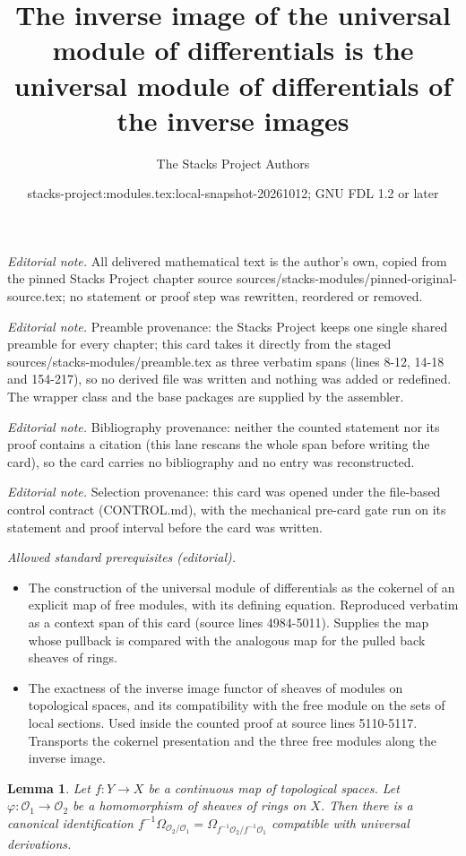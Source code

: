 \documentclass[10pt,a4paper]{amsart}
\title{The inverse image of the universal module of differentials is the universal module of differentials of the inverse images}
\author{The Stacks Project Authors}
\date{stacks-project:modules.tex:local-snapshot-20261012; GNU FDL 1.2 or later}
\theoremstyle{plain}
\newtheorem{lemma}[subsection]{Lemma}
\theoremstyle{definition}
\theoremstyle{remark}
\numberwithin{equation}{subsection}
\begin{document}
\maketitle
\noindent\textit{Editorial note.} All delivered mathematical text is the author's own, copied from the pinned Stacks Project chapter source sources/stacks-modules/pinned-original-source.tex; no statement or proof step was rewritten, reordered or removed.\par\medskip
\noindent\textit{Editorial note.} Preamble provenance: the Stacks Project keeps one single shared preamble for every chapter; this card takes it directly from the staged sources/stacks-modules/preamble.tex as three verbatim spans (lines 8-12, 14-18 and 154-217), so no derived file was written and nothing was added or redefined. The wrapper class and the base packages are supplied by the assembler.\par\medskip
\noindent\textit{Editorial note.} Bibliography provenance: neither the counted statement nor its proof contains a citation (this lane rescans the whole span before writing the card), so the card carries no bibliography and no entry was reconstructed.\par\medskip
\noindent\textit{Editorial note.} Selection provenance: this card was opened under the file-based control contract (CONTROL.md), with the mechanical pre-card gate run on its statement and proof interval before the card was written.\par\medskip
\noindent\textit{Allowed standard prerequisites (editorial).}\begin{itemize}
\item The construction of the universal module of differentials as the cokernel of an explicit map of free modules, with its defining equation. Reproduced verbatim as a context span of this card (source lines 4984-5011). Supplies the map whose pullback is compared with the analogous map for the pulled back sheaves of rings.
\item The exactness of the inverse image functor of sheaves of modules on topological spaces, and its compatibility with the free module on the sets of local sections. Used inside the counted proof at source lines 5110-5117. Transports the cokernel presentation and the three free modules along the inverse image.
\end{itemize}\medskip
\begin{lemma}
\label{lemma-pullback-differentials}
Let $f : Y \to X$ be a continuous map of topological spaces.
Let $\varphi : \mathcal{O}_1 \to \mathcal{O}_2$
be a homomorphism of sheaves of rings on $X$.
Then there is a canonical identification
$f^{-1}\Omega_{\mathcal{O}_2/\mathcal{O}_1} =
\Omega_{f^{-1}\mathcal{O}_2/f^{-1}\mathcal{O}_1}$
compatible with universal derivations.
\end{lemma}
\end{document}
